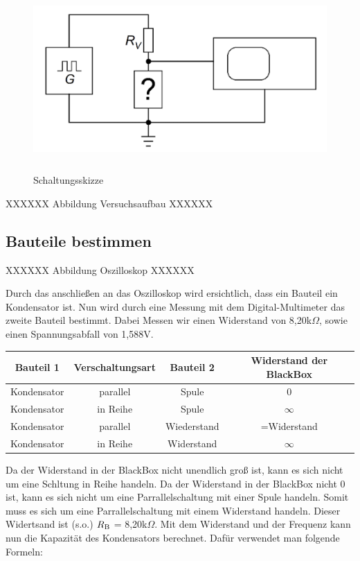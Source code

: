 \begin{figure}[H]
	\centering
	\includegraphics[height=7cm]{images/Versuch2/1_Schaltungsskizze.jpeg} 
	\caption{Schaltungsskizze}
	\label{fig: Schaltungsskizze}
\end{figure}

XXXXXX Abbildung Versuchsaufbau XXXXXX

\subsection*{Bauteile bestimmen}

XXXXXX Abbildung Oszilloskop XXXXXX

Durch das anschließen an das Oszilloskop wird ersichtlich, dass ein Bauteil ein 
Kondensator ist. Nun wird durch eine Messung mit dem Digital-Multimeter das zweite
Bauteil bestimmt. Dabei Messen wir einen Widerstand von 8,20k$\Omega$, sowie einen
Spannungsabfall von 1,588V. 

\begin{tabular}[h]{c|c|c|c}
    \textbf{Bauteil 1} & \textbf{Verschaltungsart} & \textbf{Bauteil 2} & \textbf{Widerstand der BlackBox}\\
    \hline
    Kondensator & parallel & Spule & 0 \\
    \hline
    Kondensator & in Reihe & Spule & $\infty$ \\
    \hline
    Kondensator & parallel & Wiederstand & =Widerstand \\
	\hline
	Kondensator & in Reihe & Widerstand & $\infty$ 
    \label{tab:Versuch 2: Bauteile bestimmen}
\end{tabular}

Da der Widerstand in der BlackBox nicht unendlich groß ist, kann es sich nicht um
eine Schltung in Reihe handeln. Da der Widerstand in der BlackBox nicht 0 ist, kann
es sich nicht um eine Parrallelschaltung mit einer Spule handeln. Somit muss es sich
um eine Parrallelschaltung mit einem Widerstand handeln. Dieser Widertsand ist (s.o.) 
$R\textsubscript{B}$ = 8,20k$\Omega$.
Mit dem Widerstand und der Frequenz kann nun die Kapazität des Kondensators berechnet.
Dafür verwendet man folgende Formeln:

